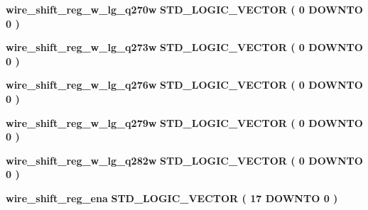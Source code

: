\begin{DoxyCompactItemize}
\item 
{\bf wire\+\_\+shift\+\_\+reg\+\_\+w\+\_\+lg\+\_\+q270w} {\bfseries \textcolor{comment}{S\+T\+D\+\_\+\+L\+O\+G\+I\+C\+\_\+\+V\+E\+C\+T\+OR}\textcolor{vhdlchar}{ }\textcolor{vhdlchar}{(}\textcolor{vhdlchar}{ }\textcolor{vhdlchar}{ } \textcolor{vhdldigit}{0} \textcolor{vhdlchar}{ }\textcolor{keywordflow}{D\+O\+W\+N\+TO}\textcolor{vhdlchar}{ }\textcolor{vhdlchar}{ } \textcolor{vhdldigit}{0} \textcolor{vhdlchar}{ }\textcolor{vhdlchar}{)}\textcolor{vhdlchar}{ }} 
\item 
{\bf wire\+\_\+shift\+\_\+reg\+\_\+w\+\_\+lg\+\_\+q273w} {\bfseries \textcolor{comment}{S\+T\+D\+\_\+\+L\+O\+G\+I\+C\+\_\+\+V\+E\+C\+T\+OR}\textcolor{vhdlchar}{ }\textcolor{vhdlchar}{(}\textcolor{vhdlchar}{ }\textcolor{vhdlchar}{ } \textcolor{vhdldigit}{0} \textcolor{vhdlchar}{ }\textcolor{keywordflow}{D\+O\+W\+N\+TO}\textcolor{vhdlchar}{ }\textcolor{vhdlchar}{ } \textcolor{vhdldigit}{0} \textcolor{vhdlchar}{ }\textcolor{vhdlchar}{)}\textcolor{vhdlchar}{ }} 
\item 
{\bf wire\+\_\+shift\+\_\+reg\+\_\+w\+\_\+lg\+\_\+q276w} {\bfseries \textcolor{comment}{S\+T\+D\+\_\+\+L\+O\+G\+I\+C\+\_\+\+V\+E\+C\+T\+OR}\textcolor{vhdlchar}{ }\textcolor{vhdlchar}{(}\textcolor{vhdlchar}{ }\textcolor{vhdlchar}{ } \textcolor{vhdldigit}{0} \textcolor{vhdlchar}{ }\textcolor{keywordflow}{D\+O\+W\+N\+TO}\textcolor{vhdlchar}{ }\textcolor{vhdlchar}{ } \textcolor{vhdldigit}{0} \textcolor{vhdlchar}{ }\textcolor{vhdlchar}{)}\textcolor{vhdlchar}{ }} 
\item 
{\bf wire\+\_\+shift\+\_\+reg\+\_\+w\+\_\+lg\+\_\+q279w} {\bfseries \textcolor{comment}{S\+T\+D\+\_\+\+L\+O\+G\+I\+C\+\_\+\+V\+E\+C\+T\+OR}\textcolor{vhdlchar}{ }\textcolor{vhdlchar}{(}\textcolor{vhdlchar}{ }\textcolor{vhdlchar}{ } \textcolor{vhdldigit}{0} \textcolor{vhdlchar}{ }\textcolor{keywordflow}{D\+O\+W\+N\+TO}\textcolor{vhdlchar}{ }\textcolor{vhdlchar}{ } \textcolor{vhdldigit}{0} \textcolor{vhdlchar}{ }\textcolor{vhdlchar}{)}\textcolor{vhdlchar}{ }} 
\item 
{\bf wire\+\_\+shift\+\_\+reg\+\_\+w\+\_\+lg\+\_\+q282w} {\bfseries \textcolor{comment}{S\+T\+D\+\_\+\+L\+O\+G\+I\+C\+\_\+\+V\+E\+C\+T\+OR}\textcolor{vhdlchar}{ }\textcolor{vhdlchar}{(}\textcolor{vhdlchar}{ }\textcolor{vhdlchar}{ } \textcolor{vhdldigit}{0} \textcolor{vhdlchar}{ }\textcolor{keywordflow}{D\+O\+W\+N\+TO}\textcolor{vhdlchar}{ }\textcolor{vhdlchar}{ } \textcolor{vhdldigit}{0} \textcolor{vhdlchar}{ }\textcolor{vhdlchar}{)}\textcolor{vhdlchar}{ }} 
\item 
{\bf wire\+\_\+shift\+\_\+reg\+\_\+ena} {\bfseries \textcolor{comment}{S\+T\+D\+\_\+\+L\+O\+G\+I\+C\+\_\+\+V\+E\+C\+T\+OR}\textcolor{vhdlchar}{ }\textcolor{vhdlchar}{(}\textcolor{vhdlchar}{ }\textcolor{vhdlchar}{ } \textcolor{vhdldigit}{17} \textcolor{vhdlchar}{ }\textcolor{keywordflow}{D\+O\+W\+N\+TO}\textcolor{vhdlchar}{ }\textcolor{vhdlchar}{ } \textcolor{vhdldigit}{0} \textcolor{vhdlchar}{ }\textcolor{vhdlchar}{)}\textcolor{vhdlchar}{ }} 

\end{DoxyCompactItemize}
